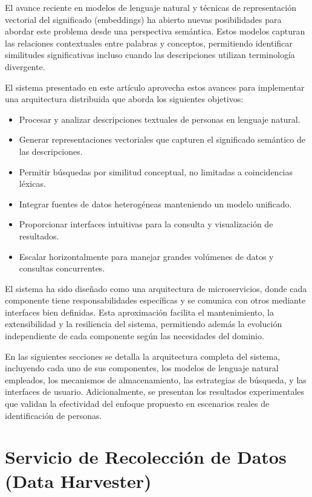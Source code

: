 \documentclass[12pt,a4paper]{article}
\begin{document}
El avance reciente en modelos de lenguaje natural y técnicas de representación vectorial del significado (embeddings) ha abierto nuevas posibilidades para abordar este problema desde una perspectiva semántica. Estos modelos capturan las relaciones contextuales entre palabras y conceptos, permitiendo identificar similitudes significativas incluso cuando las descripciones utilizan terminología divergente.

El sistema presentado en este artículo aprovecha estos avances para implementar una arquitectura distribuida que aborda los siguientes objetivos:

\begin{itemize}
    \item Procesar y analizar descripciones textuales de personas en lenguaje natural.
    \item Generar representaciones vectoriales que capturen el significado semántico de las descripciones.
    \item Permitir búsquedas por similitud conceptual, no limitadas a coincidencias léxicas.
    \item Integrar fuentes de datos heterogéneas manteniendo un modelo unificado.
    \item Proporcionar interfaces intuitivas para la consulta y visualización de resultados.
    \item Escalar horizontalmente para manejar grandes volúmenes de datos y consultas concurrentes.
\end{itemize}

El sistema ha sido diseñado como una arquitectura de microservicios, donde cada componente tiene responsabilidades específicas y se comunica con otros mediante interfaces bien definidas. Esta aproximación facilita el mantenimiento, la extensibilidad y la resiliencia del sistema, permitiendo además la evolución independiente de cada componente según las necesidades del dominio.

En las siguientes secciones se detalla la arquitectura completa del sistema, incluyendo cada uno de sus componentes, los modelos de lenguaje natural empleados, los mecanismos de almacenamiento, las estrategias de búsqueda, y las interfaces de usuario. Adicionalmente, se presentan los resultados experimentales que validan la efectividad del enfoque propuesto en escenarios reales de identificación de personas.


\section{Servicio de Recolección de Datos (Data Harvester)}
\label{sec:data-harvester}
\end{document}
